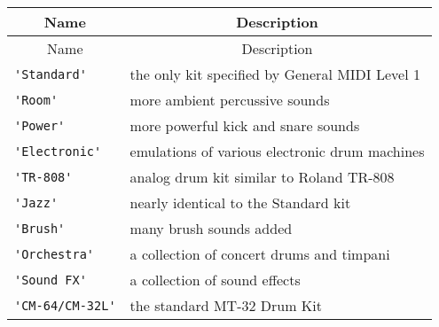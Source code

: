 \documentclass{article}
\begin{document}
\begin{center}
\begin{longtable}{ll}
\multicolumn{1}{c}{Name} & \multicolumn{1}{c}{Description} \\
\endfirsthead
\multicolumn{1}{c}{Name} & \multicolumn{1}{c}{Description} \\
\endhead
\lstinline!'Standard'! & the only kit specified by General MIDI Level 1 \\
\lstinline!'Room'! & more ambient percussive sounds \\
\lstinline!'Power'! & more powerful kick and snare sounds \\
\lstinline!'Electronic'! & emulations of various electronic drum machines \\
\lstinline!'TR-808'! & analog drum kit similar to Roland TR-808 \\
\lstinline!'Jazz'! & nearly identical to the Standard kit \\
\lstinline!'Brush'! & many brush sounds added \\
\lstinline!'Orchestra'! & a collection of concert drums and timpani \\
\lstinline!'Sound FX'! & a collection of sound effects \\
\lstinline!'CM-64/CM-32L'! & the standard MT-32 Drum Kit \\
\end{longtable}
\end{center}
\end{document}
